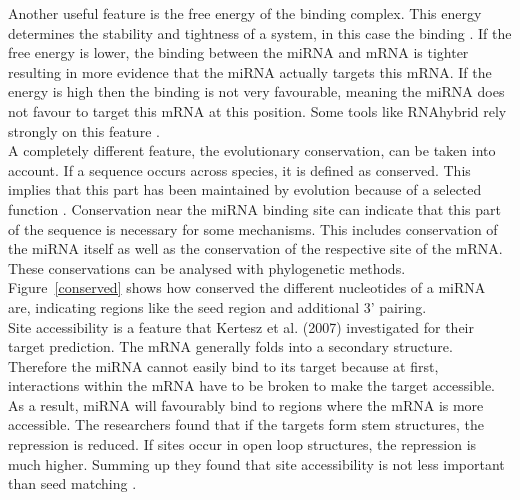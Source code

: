 \documentclass[11pt, a4paper, twoside]{book}
\begin{document}
Another useful feature is the free energy of the binding complex. This energy determines the stability and tightness of a  system, in this case the binding \cite{Peterson}. If the free energy is lower, the binding between the miRNA and mRNA is tighter resulting in more evidence that the miRNA actually targets this mRNA. If the energy is high then the binding is not very favourable, meaning the miRNA does not favour to target this mRNA at this position. Some tools like RNAhybrid rely strongly on this feature \cite{Rehmsmeier}. \\

A completely different feature, the evolutionary conservation, can be taken into account. If a sequence occurs across species, it is defined as conserved. This implies that this part has been maintained by evolution because of a selected function \cite{Peterson}. Conservation near the miRNA binding site can indicate that this part of the sequence is necessary for some mechanisms. This includes conservation of the miRNA itself as well as the conservation of the respective site of the mRNA. These conservations can be analysed with phylogenetic methods. Figure~\ref{conserved} shows how conserved the different nucleotides of a miRNA are, indicating regions like the seed region and additional 3' pairing. \\

Site accessibility is a feature that Kertesz et al. (2007) investigated for their target prediction. The mRNA generally folds into a secondary structure. Therefore the miRNA cannot easily bind to its target because at first, interactions within the mRNA have to be broken to make the target accessible. As a result, miRNA will favourably bind to regions where the mRNA is more accessible. The researchers found that if the targets form stem structures, the repression is reduced. If sites occur in open loop structures, the repression is much higher. Summing up they found that site accessibility is not less important than seed matching \cite{Kertesz}. \\
\end{document}
